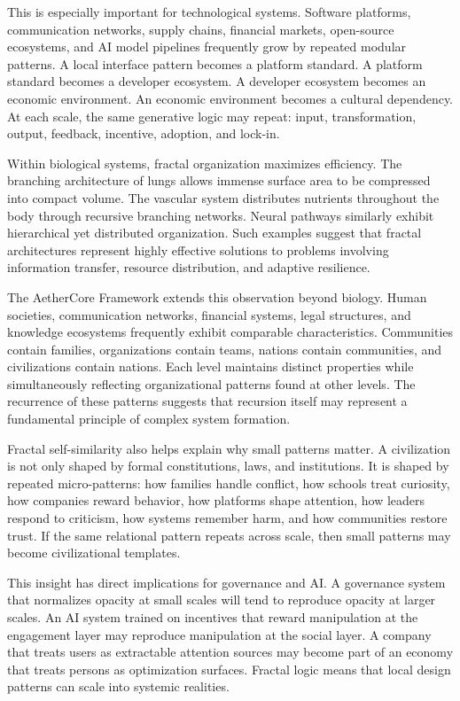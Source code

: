 \documentclass[12pt]{article}
\begin{document}
This is especially important for technological systems. Software platforms, communication networks, supply chains, financial markets, open-source ecosystems, and AI model pipelines frequently grow by repeated modular patterns. A local interface pattern becomes a platform standard. A platform standard becomes a developer ecosystem. A developer ecosystem becomes an economic environment. An economic environment becomes a cultural dependency. At each scale, the same generative logic may repeat: input, transformation, output, feedback, incentive, adoption, and lock-in.

Within biological systems, fractal organization maximizes efficiency. The branching architecture of lungs allows immense surface area to be compressed into compact volume. The vascular system distributes nutrients throughout the body through recursive branching networks. Neural pathways similarly exhibit hierarchical yet distributed organization. Such examples suggest that fractal architectures represent highly effective solutions to problems involving information transfer, resource distribution, and adaptive resilience.

The AetherCore Framework extends this observation beyond biology. Human societies, communication networks, financial systems, legal structures, and knowledge ecosystems frequently exhibit comparable characteristics. Communities contain families, organizations contain teams, nations contain communities, and civilizations contain nations. Each level maintains distinct properties while simultaneously reflecting organizational patterns found at other levels. The recurrence of these patterns suggests that recursion itself may represent a fundamental principle of complex system formation.

Fractal self-similarity also helps explain why small patterns matter. A civilization is not only shaped by formal constitutions, laws, and institutions. It is shaped by repeated micro-patterns: how families handle conflict, how schools treat curiosity, how companies reward behavior, how platforms shape attention, how leaders respond to criticism, how systems remember harm, and how communities restore trust. If the same relational pattern repeats across scale, then small patterns may become civilizational templates.

This insight has direct implications for governance and AI. A governance system that normalizes opacity at small scales will tend to reproduce opacity at larger scales. An AI system trained on incentives that reward manipulation at the engagement layer may reproduce manipulation at the social layer. A company that treats users as extractable attention sources may become part of an economy that treats persons as optimization surfaces. Fractal logic means that local design patterns can scale into systemic realities.
\end{document}
